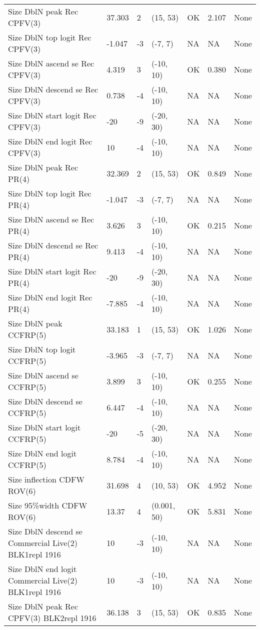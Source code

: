 \documentclass[11pt,
  english,
  letterpaper,
]{article}
\begin{document}
\begin{landscape}
\begin{longtable}[t]{>{\raggedright\arraybackslash}p{7.5cm}lllll>{\raggedright\arraybackslash}p{3.5cm}}
Size DblN peak Rec CPFV(3) & 37.303 & 2 & (15, 53) & OK & 2.107 & None\\
Size DblN top logit Rec CPFV(3) & -1.047 & -3 & (-7, 7) & NA & NA & None\\
Size DblN ascend se Rec CPFV(3) & 4.319 & 3 & (-10, 10) & OK & 0.380 & None\\
Size DblN descend se Rec CPFV(3) & 0.738 & -4 & (-10, 10) & NA & NA & None\\
Size DblN start logit Rec CPFV(3) & -20 & -9 & (-20, 30) & NA & NA & None\\
Size DblN end logit Rec CPFV(3) & 10 & -4 & (-10, 10) & NA & NA & None\\
Size DblN peak Rec PR(4) & 32.369 & 2 & (15, 53) & OK & 0.849 & None\\
Size DblN top logit Rec PR(4) & -1.047 & -3 & (-7, 7) & NA & NA & None\\
Size DblN ascend se Rec PR(4) & 3.626 & 3 & (-10, 10) & OK & 0.215 & None\\
Size DblN descend se Rec PR(4) & 9.413 & -4 & (-10, 10) & NA & NA & None\\
Size DblN start logit Rec PR(4) & -20 & -9 & (-20, 30) & NA & NA & None\\
Size DblN end logit Rec PR(4) & -7.885 & -4 & (-10, 10) & NA & NA & None\\
Size DblN peak CCFRP(5) & 33.183 & 1 & (15, 53) & OK & 1.026 & None\\
Size DblN top logit CCFRP(5) & -3.965 & -3 & (-7, 7) & NA & NA & None\\
Size DblN ascend se CCFRP(5) & 3.899 & 3 & (-10, 10) & OK & 0.255 & None\\
Size DblN descend se CCFRP(5) & 6.447 & -4 & (-10, 10) & NA & NA & None\\
Size DblN start logit CCFRP(5) & -20 & -5 & (-20, 30) & NA & NA & None\\
Size DblN end logit CCFRP(5) & 8.784 & -4 & (-10, 10) & NA & NA & None\\
Size inflection CDFW ROV(6) & 31.698 & 4 & (10, 53) & OK & 4.952 & None\\
Size 95\%width CDFW ROV(6) & 13.37 & 4 & (0.001, 50) & OK & 5.831 & None\\
Size DblN descend se Commercial Live(2) BLK1repl 1916 & 10 & -3 & (-10, 10) & NA & NA & None\\
Size DblN end logit Commercial Live(2) BLK1repl 1916 & 10 & -3 & (-10, 10) & NA & NA & None\\
Size DblN peak Rec CPFV(3) BLK2repl 1916 & 36.138 & 3 & (15, 53) & OK & 0.835 & None\\

\end{longtable}
\end{landscape}
\end{document}
